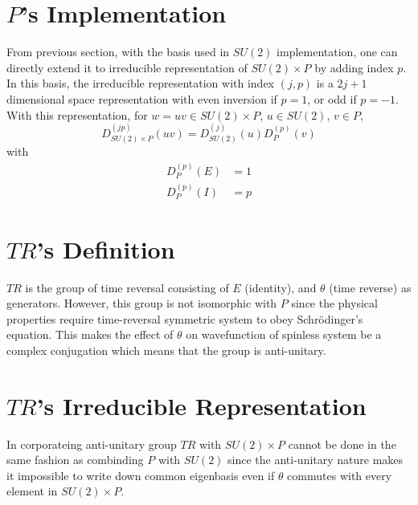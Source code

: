 \documentclass[12pt]{revtex4-2}
\begin{document}
\section{$P$'s Implementation}
From previous section, with the basis used in $SU(2)$ implementation, one can
directly extend it to irreducible representation of $SU(2)\times P$ by adding
index $p$. In this basis, the irreducible representation with index $(j, p)$ is
a $2j+1$ dimensional space representation with even inversion if $p=1$, or odd 
if $p=-1$. With this representation, for $w=uv\in SU(2)\times P$, $u \in SU(2)$, $v\in P$,
\begin{equation}
    D_{SU(2)\times P}^{(jp)}(uv) = D_{SU(2)}^{(j)}(u)D_P^{(p)}(v)
\end{equation}
with
\begin{equation}
    \begin{aligned}
        D_P^{(p)}(E) &= 1 \\
        D_P^{(p)}(I) &= p
    \end{aligned}
\end{equation}

\section{$TR$'s Definition}
$TR$ is the group of time reversal consisting of $E$ (identity), and $\theta$ (time reverse) as generators. 
However, this group is not isomorphic with $P$ since the physical properties require 
time-reversal symmetric system to obey Schr\"odinger's equation. This makes the effect 
of $\theta$ on wavefunction of spinless system be a complex conjugation which means that
the group is anti-unitary.

\section{$TR$'s Irreducible Representation}
In corporateing anti-unitary group $TR$ with $SU(2)\times P$ cannot be done in the same
fashion as combinding $P$ with $SU(2)$ since the anti-unitary nature makes it impossible
to write down common eigenbasis even if $\theta$ commutes with every element in $SU(2)\times P$.
\end{document}
